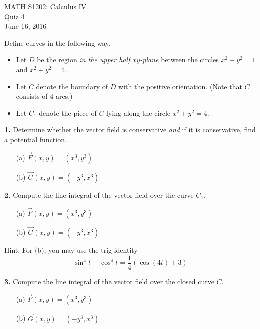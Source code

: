 \documentclass{article}
\begin{document}
\begin{center}
MATH S1202: Calculus IV \\ 
Quiz 4 \\
June 16, 2016
\end{center}

\noindent Define curves in the following way. 
\begin{itemize}
\item Let $D$ be the region \emph{in the upper half $xy$-plane} between the circles $x^2 + y^2 = 1$ and $x^2 + y^2 = 4$. 
\item Let $C$ denote the boundary of $D$ with the positive orientation. (Note that $C$ consists of 4 arcs.)
\item Let $C_1$ denote the piece of $C$ lying along the circle $x^2 + y^2 = 4$. 
\end{itemize}



\noindent \textbf{1.} Determine whether the vector field is conservative \emph{and} if it is conservative, find a potential function. 
\begin{enumerate}
\item[(a)] $\vec{F}(x,y) = (x^3, y^3)$
\item[(b)] $\vec{G}(x,y) = (-y^3, x^3)$
\end{enumerate}


\vspace{3mm}

\noindent \textbf{2.} Compute the line integral of the vector field over the curve $C_1$. 
\begin{enumerate}
\item[(a)] $\vec{F}(x,y) = (x^3, y^3)$
\item[(b)] $\vec{G}(x,y) = (-y^3, x^3)$
\end{enumerate}
Hint: For (b), you may use the trig identity 
\[
\sin^4 t + \cos^4t = \frac{1}{4}\left(\cos(4t) + 3\right)
\]



\vspace{3mm}

\noindent \textbf{3.} Compute the line integral of the vector field over the closed curve $C$. 
\begin{enumerate}
\item[(a)] $\vec{F}(x,y) = (x^3, y^3)$
\item[(b)] $\vec{G}(x,y) = (-y^3, x^3)$
\end{enumerate}

\vspace{3mm}
\end{document}
